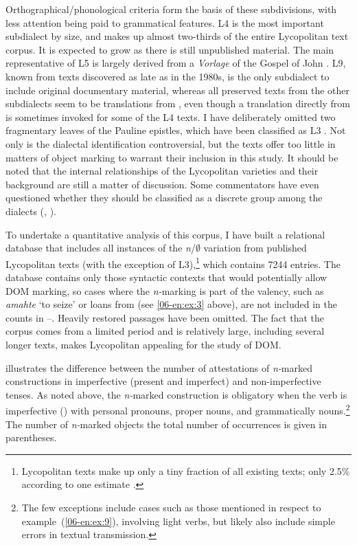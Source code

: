 \documentclass[output=paper]{LSP/langsci}
\begin{document}
Orthographical/phonological criteria form the basis of these subdivisions, with less attention being paid to grammatical features. L4 is the most important subdialect by size, and makes up almost two-thirds of the entire Lycopolitan text corpus. It is expected to grow as there is still unpublished material. The main representative of L5 is largely derived from a  \textit{Vorlage} of the Gospel of John \citep[195–207]{Askeland2012Gospel}. L9, known from texts discovered as late as in the 1980s, is the only subdialect to include original documentary material, whereas all preserved texts from the other subdialects seem to be translations from , even though a translation directly from  is sometimes invoked for some of the L4 texts. I have deliberately omitted two fragmentary leaves of the Pauline epistles, which have been classified as L3 \citep[419]{Kasser2006Aspe}. Not only is the dialectal identification controversial, but the texts offer too little in matters of object marking to warrant their inclusion in this study. It should be noted that the internal relationships of the Lycopolitan varieties and their background are still a matter of discussion. Some commentators have even questioned whether they should be classified as a discrete group among the  dialects (\citealt{Funk1985Subakhmimic}, \cf \citealt{Kasser2002Lyco-diospolitain}).

To undertake a quantitative analysis of this corpus, I have built a relational database that includes all instances of the \textit{n}/${\emptyset}$ variation from published Lycopolitan texts (with the exception of L3),\footnote{Lycopolitan texts make up only a tiny fraction of all existing  texts; only 2.5\% according to one estimate \citep[59]{Diebneretal1989Papyrus}.} which contains 7244 entries. The database contains only those syntactic contexts that would potentially allow DOM marking, so cases where the \textit{n-}marking is part of the valency, such as \textit{amahte} ‘to seize’ or loans from  (see \ref{06-en:ex:3} above), are not included in the counts in –. Heavily restored passages have been omitted. The fact that the corpus comes from a limited period and is relatively large, including several longer texts, makes Lycopolitan appealing for the study of  DOM.

 illustrates the difference between the number of attestations of \textit{n-}marked constructions in imperfective (present and imperfect) and non-imperfective tenses. As noted above, the \textit{n-}marked construction is obligatory when the verb is imperfective (\cf {}) with personal pronouns, proper nouns, and grammatically  nouns.\footnote{The few exceptions include cases such as those mentioned in respect to example~(\ref{06-en:ex:9}), involving light verbs, but likely also include simple errors in textual transmission.} The number of \textit{n-}marked objects \vs the total number of occurrences is given in parentheses. 
\end{document}
